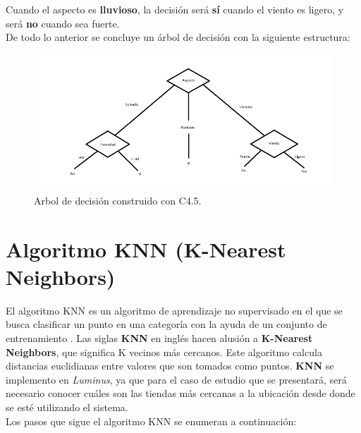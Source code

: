 \begin{UClist}
	Cuando el aspecto es \textbf{lluvioso}, la decisión será \textbf{sí} cuando el viento es ligero, y será \textbf{no} cuando sea fuerte.\\

	\UCli De todo lo anterior se concluye un árbol de decisión con la siguiente estructura:\\

	\begin{figure}[H]
		\hypertarget{fig:arbol-final-c45}{\hspace{1pt}}
		\begin{center}
			\includegraphics{capitulo2/images/arbol-final-c45.png}
			\caption{Arbol de decisión construido con C4.5.}
			\label{fig:arbol-final-c45}
		\end{center}
	\end{figure}

\end{UClist}

\newpage
\section{Algoritmo KNN (K-Nearest Neighbors)}\label{knnmarco}

El algoritmo KNN es un algoritmo de aprendizaje no supervisado en el que se busca clasificar un punto en una categoría con la ayuda de un conjunto de entrenamiento \cite{KNN}. Las siglas \textbf{KNN} en inglés hacen alusión a \textbf{K-Nearest Neighbors}, que significa K vecinos más cercanos. Este algoritmo calcula distancias euclidianas entre valores que son tomados como puntos. \textbf{KNN} se implemento en \emph{Luminus}, ya que para el caso de estudio que se presentará, será necesario conocer cuáles son las tiendas más cercanas a la ubicación desde donde se esté utilizando el sistema.\\

Los pasos que sigue el algoritmo KNN se enumeran a continuación:\\

